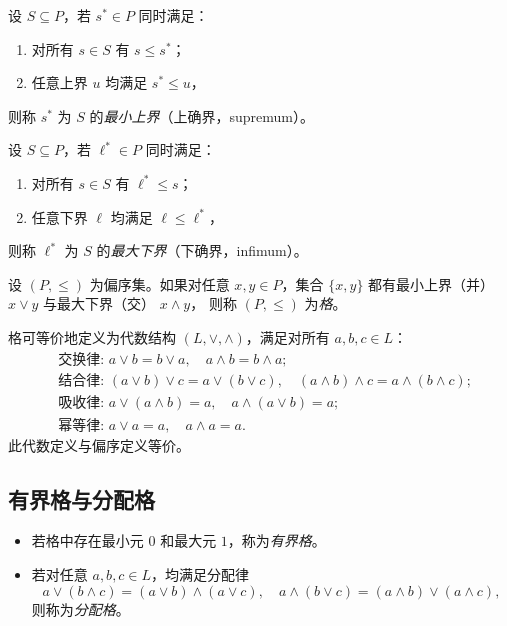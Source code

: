 \begin{definition}
  设 $S\subseteq P$，若 $s^* \in P$ 同时满足：
  \begin{enumerate}
    \item 对所有 $s\in S$ 有 $s\le s^*$；  
    \item 任意上界 $u$ 均满足 $s^*\le u$，
  \end{enumerate}
  则称 $s^*$ 为 $S$ 的\emph{最小上界}（上确界，supremum）。  
  \end{definition}
  
  \begin{definition}
  设 $S\subseteq P$，若 $\ell^* \in P$ 同时满足：
  \begin{enumerate}
    \item 对所有 $s\in S$ 有 $\ell^*\le s$；  
    \item 任意下界 $\ell$ 均满足 $\ell\le \ell^*$，
  \end{enumerate}
  则称 $\ell^*$ 为 $S$ 的\emph{最大下界}（下确界，infimum）。  
  \end{definition}


\begin{definition}
  设 $(P,\le)$ 为偏序集。如果对任意 $x,y\in P$，集合 $\{x,y\}$ 都有最小上界（并） $x\vee y$ 与最大下界（交） $x\wedge y$，
  则称 $(P,\le)$ 为\emph{格}。  
\end{definition}

\begin{proposition}[代数刻画]
  格可等价地定义为代数结构 $(L,\vee,\wedge)$，满足对所有 $a,b,c\in L$：  
  \[
  \begin{aligned}
  &\text{交换律: } a\vee b = b\vee a,\quad a\wedge b = b\wedge a;\\
  &\text{结合律: } (a\vee b)\vee c = a\vee(b\vee c),\quad (a\wedge b)\wedge c = a\wedge(b\wedge c);\\
  &\text{吸收律: } a\vee(a\wedge b)=a,\quad a\wedge(a\vee b)=a;\\
  &\text{幂等律: } a\vee a = a,\quad a\wedge a = a.
  \end{aligned}
  \]  
  此代数定义与偏序定义等价。  
\end{proposition}

\subsection{有界格与分配格}

\begin{itemize}
  \item 若格中存在最小元 $0$ 和最大元 $1$，称为\emph{有界格}。  
  \item 若对任意 $a,b,c\in L$，均满足分配律
  \[
    a\vee(b\wedge c)=(a\vee b)\wedge(a\vee c),\quad
    a\wedge(b\vee c)=(a\wedge b)\vee(a\wedge c),
  \]
  则称为\emph{分配格}。  
\end{itemize}